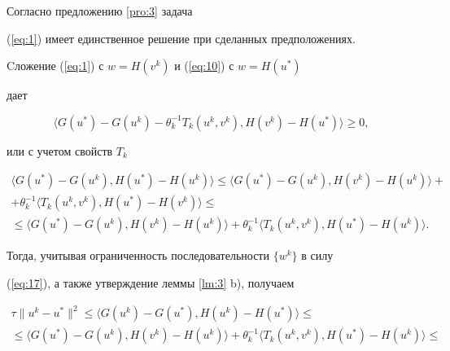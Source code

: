 \begin{pf}


Согласно предложению \ref{pro:3} задача 


(\ref{eq:1}) имеет единственное решение при сделанных предположениях. 


Cложение (\ref{eq:1}) с $w=H(v^{k})$ и (\ref{eq:10}) с $w=H(u^{*})$ 


дает 


$$


\langle G(u^{*}) - G(u^{k}) - \theta_{k}^{-1} T_{k}(u^{k}, v^{k}), 


H(v^{k}) - H(u^{*}) \rangle \geq 0,


$$


или с учетом свойств $T_{k}$


\begin{multline*}


\langle G(u^{*}) - G(u^{k}), H(u^{*}) - H(u^{k}) \rangle 


\leq \langle G(u^{*}) - G(u^{k}), H(v^{k}) - H(u^{k}) \rangle + \\


%


+\theta_{k}^{-1}\langle T_{k}(u^{k},v^{k}), H(u^{*}) - H(v^{k}) \rangle\le \\


%


\leq \langle G(u^{*}) - G(u^{k}), H(v^{k}) - H(u^{k}) \rangle


+\theta_{k}^{-1} \langle T_{k}(u^{k}, v^{k}), H(u^{*}) - H(u^{k}) \rangle. 


\end{multline*}


Тогда, учитывая ограниченность последовательности $\{ w^{k} \}$ в силу 


(\ref{eq:17}), а также утверждение леммы \ref{lm:3} b), получаем 


\begin{multline*}


\tau \| u^{k} - u^{*} \|^{2} 


\leq \langle G(u^{k}) - G(u^{*}), H(u^{k}) - H(u^{*}) \rangle \le \\


%


\leq \langle G(u^{*}) - G(u^{k}), H(v^{k}) - H(u^{k}) \rangle 


+\theta_{k}^{-1}\langle T_{k}(u^{k},v^{k}),H(u^{*}) - H(u^{k}) \rangle\le \\


%



\end{multline*}
\end{pf}
